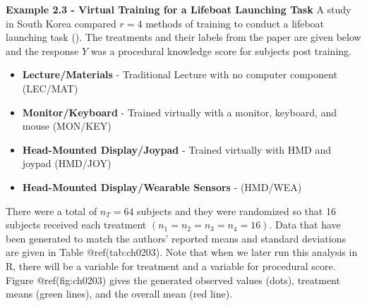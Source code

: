 \documentclass[
]{book}
\providecommand{\tightlist}{%
  \setlength{\itemsep}{0pt}\setlength{\parskip}{0pt}}
\begin{document}
\textbf{Example 2.3 - Virtual Training for a Lifeboat Launching Task} A
study in South Korea compared \(r=4\) methods of training to conduct a
lifeboat launching task ().
The treatments and their labels from the paper are given below and the
response \(Y\) was a procedural knowledge score for subjects post
training.

\begin{itemize}
\tightlist
\item
  \textbf{Lecture/Materials} - Traditional Lecture with no computer
  component (LEC/MAT)
\item
  \textbf{Monitor/Keyboard} - Trained virtually with a monitor,
  keyboard, and mouse (MON/KEY)
\item
  \textbf{Head-Mounted Display/Joypad} - Trained virtually with HMD and
  joypad (HMD/JOY)
\item
  \textbf{Head-Mounted Display/Wearable Sensors} - (HMD/WEA)
\end{itemize}

There were a total of \(n_T=64\) subjects and they were randomized so
that 16 subjects received each treatment
\(\left(n_1=n_2=n_3=n_4=16\right)\). Data that have been generated to
match the authors' reported means and standard deviations are given in
Table @ref(tab:ch0203). Note that when we later run this analysis in R,
there will be a variable for treatment and a variable for procedural
score. Figure @ref(fig:ch0203) gives the generated observed values
(dots), treatment means (green lines), and the overall mean (red line).
\end{document}
